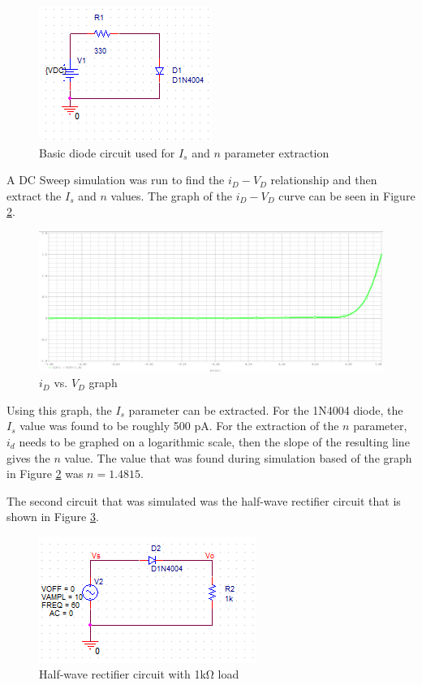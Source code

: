 \documentclass[11pt]{article}
\begin{document}
	\begin{figure}[H]
		\centering
		\includegraphics{diode_circuit.png}
		\caption{Basic diode circuit used for \(I_s\) and \(n\) parameter extraction}
		\label{fig:diode1}
	\end{figure}

	A DC Sweep simulation was run to find the \(i_D-V_D\) relationship and then extract
	the \(I_s\) and \(n\) values. The graph of the \(i_D-V_D\) curve can be seen in 
	Figure \ref{fig:id_vd_curve}.

	\begin{figure}[H]
		\centering
		\includegraphics[width=\textwidth]{Id-Vd_DC_Sweep.png}
		\caption{\(i_D\) vs. \(V_D\) graph}
		\label{fig:id_vd_curve}
	\end{figure}

	Using this graph, the \(I_s\) parameter can be extracted. For the 1N4004 diode, the 
	\(I_s\) value was found to be roughly 500 \si{\pico\ampere}. For the extraction of
	the \(n\) parameter, \(i_d\) needs to be graphed on a logarithmic scale, then the slope
	of the resulting line gives the \(n\) value. The value that was found during simulation
	based of the graph in Figure \ref{fig:id_vd_curve} was \(n = 1.4815\).\\

	\hfill\break

	The second circuit that was simulated was the half-wave rectifier circuit that is shown
	in Figure \ref{fig:half-wave_rectifier}.

	\begin{figure}[H]
		\centering
		\includegraphics{half_wave_rectifier.png}
		\caption{Half-wave rectifier circuit with 1\si{\kilo\ohm} load}
		\label{fig:half-wave_rectifier}
	\end{figure}
\end{document}
